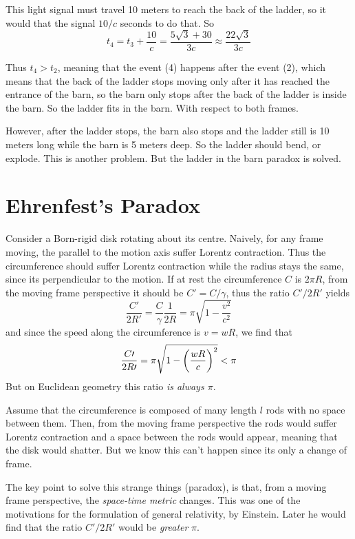\documentclass[oneside, 10pt, notitlepage]{book}
\begin{document}
This light signal must travel 10 meters to reach the back of the ladder, so it would that the signal \(10/c\) seconds to do that. So
\begin{equation}
t_4 = t_3 + \frac{10}{c} = \frac{5\sqrt{3}+30}{3c} \approx \frac{22\sqrt{3}}{3c}
\end{equation}

Thus \(t_4 > t_2\), meaning that the event (4) happens after the event (2), which means that the back of the ladder stops moving only after it has reached the entrance of the barn, so the barn only stops after the back of the ladder is inside the barn. So the ladder fits in the barn. With respect to both frames.  

However, after the ladder stops, the barn also stops and the ladder still is 10 meters long while the barn is 5 meters deep. So the ladder should bend, or explode. This is another problem. But the ladder in the barn paradox is solved.  

\section{Ehrenfest's Paradox}

Consider a Born-rigid disk rotating about its centre. Naively, for any frame moving, the parallel to the motion axis suffer Lorentz contraction. Thus the circumference should suffer Lorentz contraction while the radius stays the same, since its perpendicular to the motion. If at rest the circumference \(C\) is \(2\pi R\), from the moving frame perspective it should be \(C{\prime} = C/\gamma\), thus the ratio \(C{\prime}/2R{\prime}\) yields
\begin{equation}\frac{C{\prime}}{2R{\prime}} = \frac{C}{\gamma}\frac{1}{2R} = \pi \sqrt{1-\frac{v^2}{c^2}}\end{equation}
and since the speed along the circumference is \(v=wR\), we find that
\begin{equation}\frac{C{\prime}}{2R{\prime}} = \pi \sqrt{1-\left(\frac{wR}{c}\right)^2} < \pi\end{equation}
But on Euclidean geometry this ratio \emph{is always \(\pi\)}.

Assume that the circumference is composed of many length \(l\) rods with no space between them. Then, from the moving frame perspective the rods would suffer Lorentz contraction and a space between the rods would appear, meaning that the disk would shatter. But we know this can't happen since its only a change of frame.  

The key point to solve this strange things (paradox), is that, from a moving frame perspective, the \emph{space-time metric} changes. This was one of the motivations for the formulation of general relativity, by Einstein. Later he would find that the ratio \(C{\prime}/2R{\prime}\) would be \emph{greater} \(\pi\).  
\end{document}
